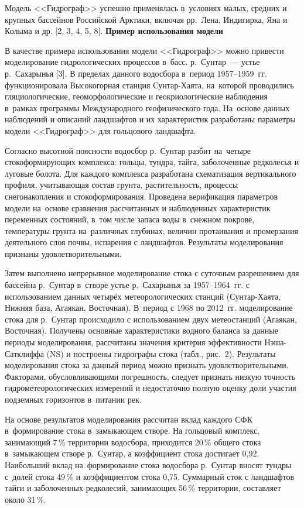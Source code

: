 Модель <<Гидрограф>> успешно применялась в~условиях малых, средних и крупных бассейнов Российской Арктики, включая рр.~Лена, Индигирка, Яна и Колыма и др. [2, 3, 4, 5, 8].
\clearpage
\textbf{Пример использования модели}

В качестве примера использования модели <<Гидрограф>> можно привести моделирование гидрологических процессов в~басс.  р.~Сунтар~--- устье р.~Сахарынья [3]. В пределах данного водосбора в~период 1957--1959~гг. функционировала Высокогорная станция Сунтар-Хаята, на~которой проводились гляциологические, геоморфологические и геокриологические наблюдения в~рамках программы Международного геофизического года. На~основе данных наблюдений и описаний ландшафтов и их характеристик разработаны параметры модели <<Гидрограф>> для гольцового ландшафта.

Согласно высотной поясности водосбор р.~Сунтар разбит на~четыре стокоформирующих комплекса: гольцы, тундра, тайга, заболоченные редколесья и луговые болота. Для каждого комплекса разработана схематизация вертикального профиля, учитывающая состав грунта, растительность, процессы снегонакопления и стокоформирования. Проведена верификация параметров модели на~основе сравнения рассчитанных и наблюденных характеристик переменных состояний, в~том числе запаса воды в~снежном покрове, температуры грунта на~различных глубинах, величин протаивания и промерзания деятельного слоя почвы, испарения с ландшафтов. Результаты моделирования признаны удовлетворительными.

Затем выполнено непрерывное моделирование стока с суточным разрешением для бассейна р.~Сунтар в~створе устье р.~Сахарынья за 1957--1964~гг. с использованием данных четырёх метеорологических станций (Сунтар-Хаята, Нижняя база, Агаякан, Восточная). В~период с 1968 по 2012~гг. моделирование стока для р.~Сунтар происходило с использованием двух метеостанций (Агаякан, Восточная). Получены основные характеристики водного баланса за данные периоды моделирования, рассчитаны значения критерия эффективности Нэша-Сатклиффа (NS) и построены гидрографы стока (табл., рис.~2). Результаты моделирования стока за данный период можно признать удовлетворительными. Факторами, обусловливающими погрешность, следует признать низкую точность гидрометеорологических измерений и недостаточно полную оценку доли участия подземных горизонтов в~питании рек.





На основе результатов моделирования рассчитан вклад каждого СФК в~формирование стока в~замыкающем створе. На гольцовый комплекс, занимающий 7\,\% территории водосбора, приходится 20\,\% общего стока в~замыкающем створе р.~Сунтар, а коэффициент стока достигает 0,92. Наибольший вклад на~формирование стока водосбора р.~Сунтар вносят тундры с~долей стока 49\,\% и коэффициентом стока 0,75. Суммарный сток с ландшафтов тайги и заболоченных редколесий, занимающих 56\,\% территории, составляет около 31\,\%.

